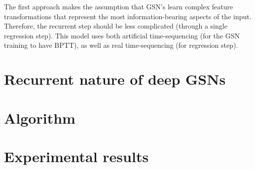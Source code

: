 The first approach makes the assumption that GSN's learn complex feature transformations that represent the most information-bearing aspects of the input. Therefore, the recurrent step should be less complicated (through a single regression step). This model uses both artificial time-sequencing (for the GSN training to have BPTT), as well as real time-sequencing (for regression step).



\section{Recurrent nature of deep GSNs}

\section{Algorithm}

\section{Experimental results}